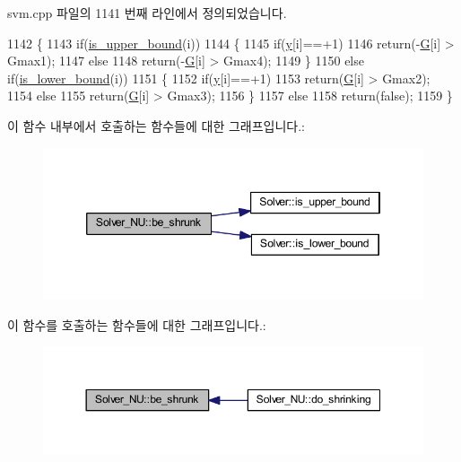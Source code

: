 svm.\+cpp 파일의 1141 번째 라인에서 정의되었습니다.


\begin{DoxyCode}
1142 \{
1143     \textcolor{keywordflow}{if}(\hyperlink{class_solver_a98d878b13d6f710fcaa0b16e657a37b6}{is\_upper\_bound}(i))
1144     \{
1145         \textcolor{keywordflow}{if}(\hyperlink{class_solver_a3acc1043d06dedf87f054ff3eea5c426}{y}[i]==+1)
1146             \textcolor{keywordflow}{return}(-\hyperlink{class_solver_ad8ab27068f2e045591970aae1201afe9}{G}[i] > Gmax1);
1147         \textcolor{keywordflow}{else}    
1148             \textcolor{keywordflow}{return}(-\hyperlink{class_solver_ad8ab27068f2e045591970aae1201afe9}{G}[i] > Gmax4);
1149     \}
1150     \textcolor{keywordflow}{else} \textcolor{keywordflow}{if}(\hyperlink{class_solver_a5876eedb0a6de6954f6037af0992cbed}{is\_lower\_bound}(i))
1151     \{
1152         \textcolor{keywordflow}{if}(\hyperlink{class_solver_a3acc1043d06dedf87f054ff3eea5c426}{y}[i]==+1)
1153             \textcolor{keywordflow}{return}(\hyperlink{class_solver_ad8ab27068f2e045591970aae1201afe9}{G}[i] > Gmax2);
1154         \textcolor{keywordflow}{else}    
1155             \textcolor{keywordflow}{return}(\hyperlink{class_solver_ad8ab27068f2e045591970aae1201afe9}{G}[i] > Gmax3);
1156     \}
1157     \textcolor{keywordflow}{else}
1158         \textcolor{keywordflow}{return}(\textcolor{keyword}{false});
1159 \}
\end{DoxyCode}


이 함수 내부에서 호출하는 함수들에 대한 그래프입니다.\+:
\nopagebreak
\begin{figure}[H]
\begin{center}
\leavevmode
\includegraphics[width=346pt]{class_solver___n_u_ab22738c68164e939d7d0d5de5a5b15f3_cgraph}
\end{center}
\end{figure}




이 함수를 호출하는 함수들에 대한 그래프입니다.\+:
\nopagebreak
\begin{figure}[H]
\begin{center}
\leavevmode
\includegraphics[width=350pt]{class_solver___n_u_ab22738c68164e939d7d0d5de5a5b15f3_icgraph}
\end{center}
\end{figure}


